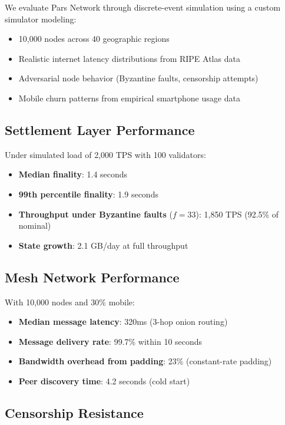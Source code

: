 \documentclass[11pt,a4paper,twocolumn]{article}
\begin{document}
We evaluate Pars Network through discrete-event simulation using a custom simulator modeling:
\begin{itemize}[leftmargin=*]
  \item 10,000 nodes across 40 geographic regions
  \item Realistic internet latency distributions from RIPE Atlas data
  \item Adversarial node behavior (Byzantine faults, censorship attempts)
  \item Mobile churn patterns from empirical smartphone usage data
\end{itemize}

\subsection{Settlement Layer Performance}

Under simulated load of 2,000 TPS with 100 validators:
\begin{itemize}[leftmargin=*]
  \item \textbf{Median finality}: 1.4 seconds
  \item \textbf{99th percentile finality}: 1.9 seconds
  \item \textbf{Throughput under Byzantine faults} ($f = 33$): 1,850 TPS (92.5\% of nominal)
  \item \textbf{State growth}: 2.1 GB/day at full throughput
\end{itemize}

\subsection{Mesh Network Performance}

With 10,000 nodes and 30\% mobile:
\begin{itemize}[leftmargin=*]
  \item \textbf{Median message latency}: 320ms (3-hop onion routing)
  \item \textbf{Message delivery rate}: 99.7\% within 10 seconds
  \item \textbf{Bandwidth overhead from padding}: 23\% (constant-rate padding)
  \item \textbf{Peer discovery time}: 4.2 seconds (cold start)
\end{itemize}

\subsection{Censorship Resistance}
\end{document}
